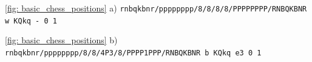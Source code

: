 \centerline{
    \ref{fig: basic_chess_positions} a) \lstset{basicstyle=\ttfamily}\lstinline{rnbqkbnr/pppppppp/8/8/8/8/PPPPPPPP/RNBQKBNR w KQkq - 0 1}
}
\centerline{
    \ref{fig: basic_chess_positions} b) \lstset{basicstyle=\ttfamily}\lstinline{rnbqkbnr/pppppppp/8/8/4P3/8/PPPP1PPP/RNBQKBNR b KQkq e3 0 1}
}

